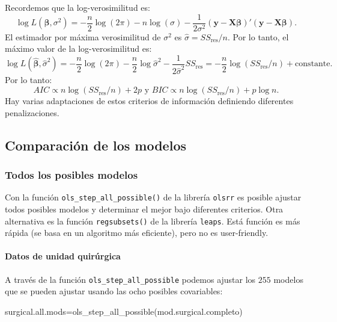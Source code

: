 \documentclass[
]{article}
\newenvironment{Shaded}{\begin{snugshade}}{\end{snugshade}}
\newcommand{\FunctionTok}[1]{\textcolor[rgb]{0.00,0.00,0.00}{#1}}
\newcommand{\NormalTok}[1]{#1}
\newcommand{\OtherTok}[1]{\textcolor[rgb]{0.56,0.35,0.01}{#1}}
\begin{document}
Recordemos que la log-verosimilitud es:
\[
\log L(\boldsymbol \beta,\sigma^{2}) = - \frac{n}{2}\log (2\pi) - n\log(\sigma) - \frac{1}{2\sigma^{2}}(\boldsymbol y- \boldsymbol X\boldsymbol \beta)'(\boldsymbol y-\boldsymbol X\boldsymbol \beta).
\]
El estimador por máxima verosimilitud de \(\sigma^{2}\) es \(\widehat{\sigma}=SS_{\mbox{res}}/n\). Por lo tanto, el máximo valor de la log-verosimilitud es:
\[
\log L(\widehat{\boldsymbol \beta},\widehat{\sigma}^{2}) = -\frac{n}{2}\log (2\pi) - \frac{n}{2}\log\widehat{\sigma}^{2} - \frac{1}{2\widehat{\sigma}^{2}}SS_{\mbox{res}}= -\frac{n}{2}\log (SS_{\mbox{res}}/n) + \mbox{constante}.
\]
Por lo tanto:
\[
AIC \propto n\log(SS_{\mbox{res}}/n) + 2p \mbox{ y } BIC \propto n\log(SS_{\mbox{res}}/n) + p\log n.
\]
Hay varias adaptaciones de estos criterios de información definiendo diferentes penalizaciones.

\hypertarget{comparaciuxf3n-de-los-modelos}{%
\subsection{Comparación de los modelos}\label{comparaciuxf3n-de-los-modelos}}

\hypertarget{todos-los-posibles-modelos}{%
\subsubsection{Todos los posibles modelos}\label{todos-los-posibles-modelos}}

Con la función \texttt{ols\_step\_all\_possible()} de la librería \texttt{olsrr} es posible ajustar todos posibles modelos y determinar el mejor bajo diferentes criterios. Otra alternativa es la función \texttt{regsubsets()} de la librería \texttt{leaps}. Está función es más rápida (se basa en un algoritmo más eficiente), pero no es user-friendly.

\hypertarget{datos-de-unidad-quiruxfargica}{%
\paragraph{Datos de unidad quirúrgica}\label{datos-de-unidad-quiruxfargica}}

A través de la función \texttt{ols\_step\_all\_possible} podemos ajustar los \(255\) modelos que se pueden ajustar usando las ocho posibles covariables:

\begin{Shaded}
\begin{Highlighting}[]
\NormalTok{surgical.all.mods}\OtherTok{=}\FunctionTok{ols\_step\_all\_possible}\NormalTok{(mod.surgical.completo)}
\end{Highlighting}
\end{Shaded}
\end{document}
